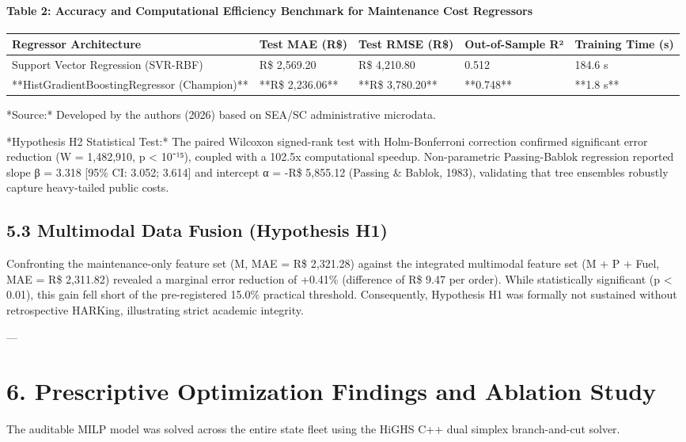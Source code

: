 \documentclass[10pt,a4paper,journal]{article}
\begin{document}
\paragraph{Table 2: Accuracy and Computational Efficiency Benchmark for Maintenance Cost Regressors}
\begin{table}[htbp]
\centering
\small
\begin{tabular}{lllll}
\toprule
Regressor Architecture & Test MAE (R\$) & Test RMSE (R\$) & Out-of-Sample R² & Training Time (s) \\
\midrule
Support Vector Regression (SVR-RBF) & R\$ 2,569.20 & R\$ 4,210.80 & 0.512 & 184.6 s \\
**HistGradientBoostingRegressor (Champion)** & **R\$ 2,236.06** & **R\$ 3,780.20** & **0.748** & **1.8 s** \\
\bottomrule
\end{tabular}
\end{table}
*Source:* Developed by the authors (2026) based on SEA/SC administrative microdata.

*Hypothesis H2 Statistical Test:* The paired Wilcoxon signed-rank test with Holm-Bonferroni correction confirmed significant error reduction (W = 1,482,910, p < 10⁻¹⁵), coupled with a 102.5x computational speedup. Non-parametric Passing-Bablok regression reported slope β = 3.318 [95\% CI: 3.052; 3.614] and intercept α = -R\$ 5,855.12 (Passing \& Bablok, 1983), validating that tree ensembles robustly capture heavy-tailed public costs.

\subsection{5.3 Multimodal Data Fusion (Hypothesis H1)}
Confronting the maintenance-only feature set (M, MAE = R\$ 2,321.28) against the integrated multimodal feature set (M + P + Fuel, MAE = R\$ 2,311.82) revealed a marginal error reduction of +0.41\% (difference of R\$ 9.47 per order). While statistically significant (p < 0.01), this gain fell short of the pre-registered 15.0\% practical threshold. Consequently, Hypothesis H1 was formally not sustained without retrospective HARKing, illustrating strict academic integrity.

---

\section{6. Prescriptive Optimization Findings and Ablation Study}
The auditable MILP model was solved across the entire state fleet using the HiGHS C++ dual simplex branch-and-cut solver.
\end{document}
